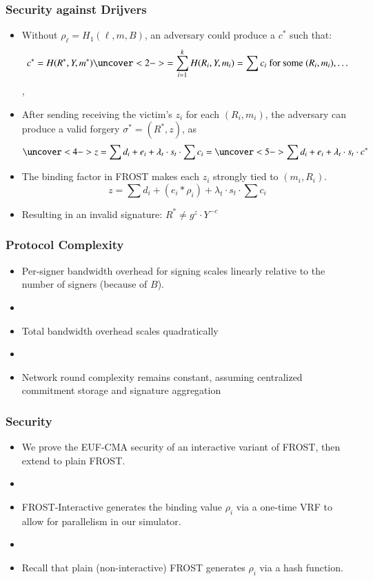 \documentclass[hyperref={pdfpagelabels=true},table,dvipsnames,14pt,aspectratio=169]{beamer}
\begin{document}
\begin{frame}
  \frametitle{Security against Drijvers}
  \small

  \begin{itemize}
    \item<1->[] Without $\rho_\ell = H_1(\ell, m, B) $,
  an adversary could produce a $c^*$ such that:
      \[ c^*= H(R^*, Y, m^*) \uncover<2->{ = \sum_{i=1}^{k} H(R_i, Y, m_i)  =
      \sum c_i  \text{ for some } (R_i, m_i), \dots } \],
    \item<3->[] After sending receiving the victim's $z_i$ for each $(R_i, m_i)$, the
  adversary can produce a valid forgery $\sigma^*=(R^*, z)$, as
      \[ \uncover<4-> {z = \sum d_i + e_i + \lambda_t \cdot s_t \cdot \sum c_i} = \uncover<5->
      { \sum d_i + e_i + \lambda_t \cdot s_t \cdot c^*} \]
    \item<6->[] The binding factor in FROST makes each $z_i$ strongly tied to
      $(m_i, R_i)$.
      \[ z = \sum d_i + (e_i * \rho_i) + \lambda_t \cdot s_t \cdot \sum c_i  \]
    \item<7->[] Resulting in an invalid signature: $R^* \neq g^z \cdot Y^{-c}$
  \end{itemize}
\end{frame}

\begin{frame}
  \frametitle{Protocol Complexity}

  \begin{itemize}
    \item<1-> Per-signer bandwidth overhead for signing scales linearly
      relative to the number of signers (because of $B$).
    \item[]~
    \item<2-> Total bandwidth overhead scales quadratically
    \item[]~
    \item<3-> Network round complexity remains constant, assuming centralized
      commitment storage and signature aggregation
  \end{itemize}

\end{frame}

\begin{frame}
  \frametitle{Security}

  \begin{itemize}
    \item<1-> We prove the EUF-CMA security of an interactive variant of FROST,
      then extend to plain FROST.
    \item[]
    \item<2-> FROST-Interactive generates the
      binding value $\rho_i$ via a one-time VRF to allow for parallelism in our
      simulator.
    \item[]
    \item<3->Recall that plain (non-interactive) FROST generates $\rho_i$ via a
      hash function.
  \end{itemize}
\end{frame}
\end{document}
